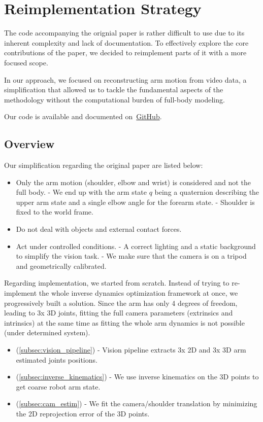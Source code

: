 \section{Reimplementation Strategy}
\label{sec:remplementation}

The code accompanying the orignial paper is rather difficult to use due to its inherent complexity and lack of documentation. 
To effectively explore the core contributions of the paper, we decided to reimplement parts of it with a more focused scope.

In our approach, we focused on reconstructing arm motion from video data,
a simplification that allowed us to tackle the fundamental 
aspects of the methodology without the computational burden of full-body modeling.

Our code is available and documented on~\href{https://github.com/balthazarneveu/monocular_pose_and_forces_estimation}{GitHub}.

\subsection{Overview}
\label{subsec:overview}
Our simplification regarding the original paper are listed below:
\begin{itemize}
    \item Only the arm motion (shoulder, elbow and wrist) is considered and not the full body.
    \subitem - We end up with the arm state $q$ being a quaternion describing 
    the upper arm state and a single elbow angle for the forearm state.
    \subitem - Shoulder is fixed to the world frame.
    \item Do not deal with objects and external contact forces.
    \item Act under controlled conditions.
    \subitem - A correct lighting and a static background to simplify the vision task.
    \subitem - We make sure that the camera is on a tripod and geometrically calibrated.
\end{itemize}

Regarding implementation, we started from scratch. Instead of trying to re-implement
the whole inverse dynamics optimization framework at once, we progressively built a solution.
Since the arm has only 4 degrees of freedom, leading to 3x 3D joints, 
fitting the full camera parameters (extrinsics and intrinsics) at the same time
as fitting the whole arm dynamics is not possible (under determined system).
\begin{itemize}
    \item (\ref{subsec:vision_pipeline}) - Vision pipeline 
    extracts 3x 2D and 3x 3D arm estimated joints positions.
    \item (\ref{subsec:inverse_kinematics}) - We use inverse kinematics  
    on the 3D points to get coarse robot arm state.
    \item (\ref{subsec:cam_estim}) - We fit the camera/shoulder translation 
    by minimizing the 2D reprojection error of the 3D points.
\end{itemize}



